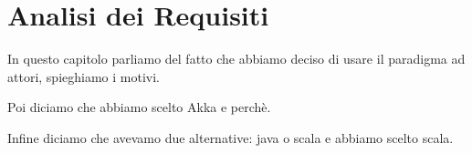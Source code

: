 \section{Analisi dei Requisiti}

In questo capitolo parliamo del fatto che abbiamo deciso di usare il paradigma ad attori, spieghiamo i motivi.

Poi diciamo che abbiamo scelto Akka e perchè.


Infine diciamo che avevamo due alternative: java o scala e abbiamo scelto scala.
